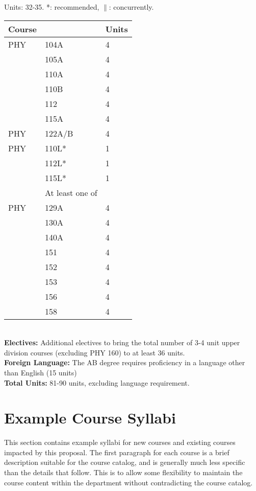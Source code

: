 \documentclass[12pt]{article}
\begin{document}
\newpage
{}
\noindent
\vskip 0.25cm
Units:  32-35. *: recommended, $\parallel$: concurrently.\\
\begin{tabular}{|lll|}
\hline
Course & & Units \\
\hline
PHY & 104A & 4 \\
    & 105A & 4 \\
    & 110A & 4 \\
    & 110B & 4 \\
    & 112  & 4 \\
    & 115A & 4 \\
\hline
PHY & 122A/B & 4 \\

\hline
PHY & 110L* & 1 \\
    & 112L* & 1 \\
    & 115L* & 1 \\
\hline
    & At least one of & \\ 
\hline
PHY & 129A & 4 \\
    & 130A & 4 \\
    & 140A & 4 \\
    & 151 & 4 \\
    & 152 & 4 \\
    & 153 & 4 \\
    & 156 & 4 \\
    & 158 & 4 \\
\hline
\end{tabular}\\ \vskip 0.25cm
\noindent
    {\bf Electives:} Additional electives to bring the total number of 3-4 unit upper division courses (excluding PHY 160) to at least 36 units. \\
    {\bf Foreign Language:} The AB degree requires proficiency in a language other than English (15 units)\\
\noindent
{\bf Total Units:} 81-90 units, excluding language requirement.

\section{Example Course Syllabi}
\label{sec:syllabi}

This section contains example syllabi for new courses and existing
courses impacted by this proposal.  The first paragraph for each
course is a brief description suitable for the course catalog, and is
generally much less specific than the details that follow.  This is to
allow some flexibility to maintain the course content within the
department without contradicting the course catalog.
\end{document}
